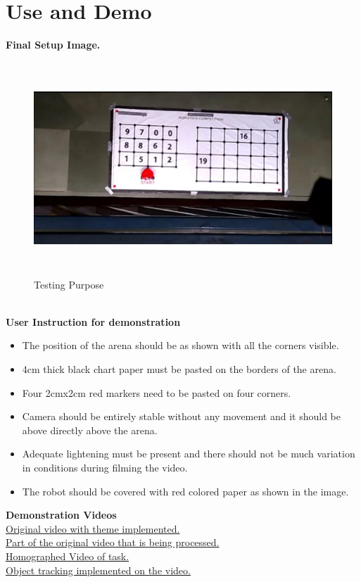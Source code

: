 \documentclass[a4paper,12pt,oneside]{book}
\begin{document}
\section{Use and Demo}
\textbf{Final Setup Image.}
    \begin{figure}[h!]
		\includegraphics[width=1\linewidth, height=8cm]{Capture.JPG}
		\centering
		\caption{Testing Purpose}
	\end{figure}\\
\textbf{User Instruction for demonstration}
\begin{itemize}
  \item The position of the arena should be as shown with all the corners visible.
  \item 4cm thick black chart paper must be pasted on the borders of the arena.
  \item Four 2cmx2cm red markers need to be pasted on four corners.
  \item Camera should be entirely stable without any movement and it should be above directly above the arena.
  \item Adequate lightening must be present and there should not be much variation in conditions during filming the video.
  \item The robot should be covered with red colored paper as shown in the image.
\end{itemize}
\textbf{Demonstration Videos}\\
\href{https://youtu.be/vaqDc_Qd9p8}{Original video with theme implemented.}\\
\href{https://youtu.be/ZgN-Ncc9VRw}{Part of the original video that is being processed.}\\
\href{https://youtu.be/vI5nk7CcUwI}{Homographed Video of task.}\\
\href{https://youtu.be/gpSy3z4Rkdc}{Object tracking implemented on the video.}
\end{document}
